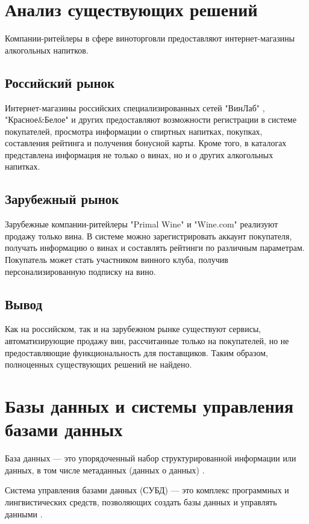 \section{Анализ существующих решений}

Компании-ритейлеры в сфере виноторговли предоставляют интернет-магазины алкогольных напитков.

\subsection{Российский рынок}

Интернет-магазины российских специализированных сетей "ВинЛаб" \cite{winelab}, "Красное\&Белое" \cite{kb} и других предоставляют возможности 
регистрации в системе покупателей, просмотра информации о спиртных напитках, покупках, составления рейтинга и получения бонусной карты. Кроме того, в каталогах представлена информация не только о винах, но и о других алкогольных напитках.

\subsection{Зарубежный рынок}

Зарубежные компании-ритейлеры "Primal Wine" \cite{primal_wine} и "Wine.com" \cite{wine_com} реализуют продажу только вина. В системе можно зарегистрировать аккаунт покупателя, получать информацию о винах и составлять рейтинги по различным параметрам. Покупатель может стать участником винного клуба, получив персонализированную подписку на вино. 

\subsection{Вывод}

Как на российском, так и на зарубежном рынке существуют сервисы, автоматизирующие продажу вин, рассчитанные только на покупателей, но не предоставляющие функциональность для поставщиков. Таким образом, полноценных существующих решений не найдено.

\section{Базы данных и системы управления базами данных}

База данных --- это упорядоченный набор структурированной информации или данных, в том числе метаданных (данных о данных) \cite{db}.

Система управления базами данных (СУБД) --- это комплекс программных и лингвистических средств, позволяющих создать базы данных и управлять данными \cite{dms}.

